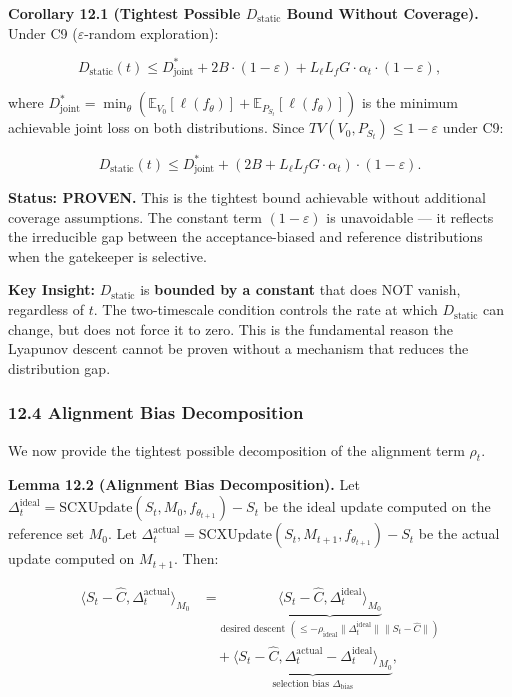 \documentclass[
  12pt,
]{ctexart}
\begin{document}
\textbf{Corollary 12.1 (Tightest Possible \(D_{\text{static}}\) Bound
Without Coverage).} Under C9 (\(\varepsilon\)-random exploration):

\[D_{\text{static}}(t) \leq D_{\text{joint}}^* + 2B \cdot (1 - \varepsilon) + L_\ell L_f G \cdot \alpha_t \cdot (1 - \varepsilon),\]

where
\(D_{\text{joint}}^* = \min_\theta (\mathbb{E}_{V_0}[\ell(f_\theta)] + \mathbb{E}_{P_{S_t}}[\ell(f_\theta)])\)
is the minimum achievable joint loss on both distributions. Since
\(TV(V_0, P_{S_t}) \leq 1 - \varepsilon\) under C9:

\[D_{\text{static}}(t) \leq D_{\text{joint}}^* + (2B + L_\ell L_f G \cdot \alpha_t) \cdot (1 - \varepsilon).\]

\textbf{Status: PROVEN.} This is the tightest bound achievable without
additional coverage assumptions. The constant term \((1-\varepsilon)\)
is unavoidable --- it reflects the irreducible gap between the
acceptance-biased and reference distributions when the gatekeeper is
selective.

\textbf{Key Insight:} \(D_{\text{static}}\) is \textbf{bounded by a
constant} that does NOT vanish, regardless of \(t\). The two-timescale
condition controls the rate at which \(D_{\text{static}}\) can change,
but does not force it to zero. This is the fundamental reason the
Lyapunov descent cannot be proven without a mechanism that reduces the
distribution gap.

\subsubsection{12.4 Alignment Bias
Decomposition}\label{alignment-bias-decomposition}

We now provide the tightest possible decomposition of the alignment term
\(\rho_t\).

\textbf{Lemma 12.2 (Alignment Bias Decomposition).} Let
\(\Delta_t^{\text{ideal}} = \text{SCXUpdate}(S_t, M_0, f_{\theta_{t+1}}) - S_t\)
be the ideal update computed on the reference set \(M_0\). Let
\(\Delta_t^{\text{actual}} = \text{SCXUpdate}(S_t, M_{t+1}, f_{\theta_{t+1}}) - S_t\)
be the actual update computed on \(M_{t+1}\). Then:

\[\begin{aligned}
\langle S_t - \hat{C}, \Delta_t^{\text{actual}} \rangle_{M_0} &= \underbrace{\langle S_t - \hat{C}, \Delta_t^{\text{ideal}} \rangle_{M_0}}_{\text{desired descent } (\leq -\rho_{\text{ideal}} \|\Delta_t^{\text{ideal}}\| \|S_t - \hat{C}\|)} \\
&\quad + \underbrace{\langle S_t - \hat{C}, \Delta_t^{\text{actual}} - \Delta_t^{\text{ideal}} \rangle_{M_0}}_{\text{selection bias } \Delta_{\text{bias}}},
\end{aligned}\]
\end{document}

